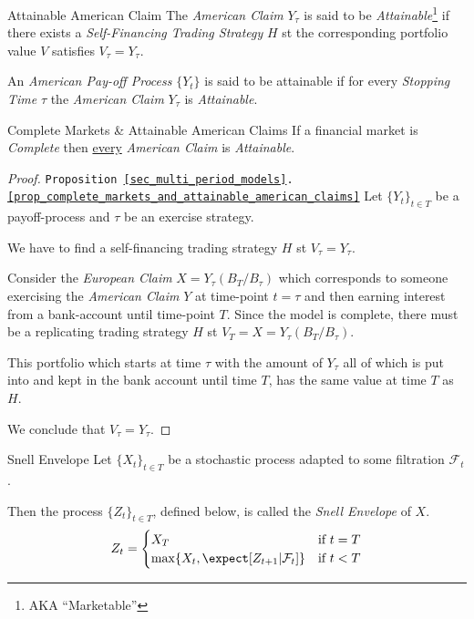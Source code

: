 \documentclass[11pt,a4paper]{article}
\begin{document}
  \begin{definition}{Attainable American Claim}
    The \textit{American Claim} $Y_\tau$ is said to be \textit{Attainable}\footnote{AKA ``Marketable''} if there exists a \textit{Self-Financing Trading Strategy} $H$ st the corresponding portfolio value $V$ satisfies $V_\tau=Y_\tau$.
    \par An \textit{American Pay-off Process} $\{Y_t\}$ is said to be attainable if for every \textit{Stopping Time} $\tau$ the \textit{American Claim} $Y_\tau$ is \textit{Attainable}.
  \end{definition}

  \begin{proposition}{Complete Markets \& Attainable American Claims}\label{prop_complete_markets_and_attainable_american_claims}
    If a financial market is \textit{Complete} then \underline{every} \textit{American Claim} is \textit{Attainable}.
  \end{proposition}

  \begin{proof}{\texttt{Proposition \ref{sec_multi_period_models}.\ref{prop_complete_markets_and_attainable_american_claims}}}
    Let $\{Y_t\}_{t\in T}$ be a payoff-process and $\tau$ be an exercise strategy.
    \par  We have to find a self-financing trading strategy $H$ st $V_\tau=Y_\tau$.
    \par Consider the \textit{European Claim} $X=Y_\tau(B_T/B_\tau)$ which corresponds to someone exercising the \textit{American Claim} $Y$ at time-point $t=\tau$ and then earning interest from a bank-account until time-point $T$. Since the model is complete, there must be a replicating trading strategy $H$ st $V_T=X=Y_\tau(B_T/B_\tau)$.
    \par This portfolio which starts at time $\tau$ with the amount of $Y_\tau$ all of which is put into and kept in the bank account until time $T$, has the same value at time $T$ as $H$.
    \par We conclude that $V_\tau=Y_\tau$.\proved
  \end{proof}

  \begin{definition}{Snell Envelope}
    Let $\{X_t\}_{t\in T}$ be a stochastic process adapted to some filtration $\mathcal{F}_t$.
    \par Then the process $\{Z_t\}_{t\in T}$, defined below, is called the \textit{Snell Envelope} of $X$.
    \[ Z_t=\begin{cases}
      X_T&\text{if }t=T\\
      \max\{X_t,\expect[Z_{t+1}|\mathcal{F}_t]\}&\text{if }t<T
    \end{cases} \]
  \end{definition}
\end{document}
